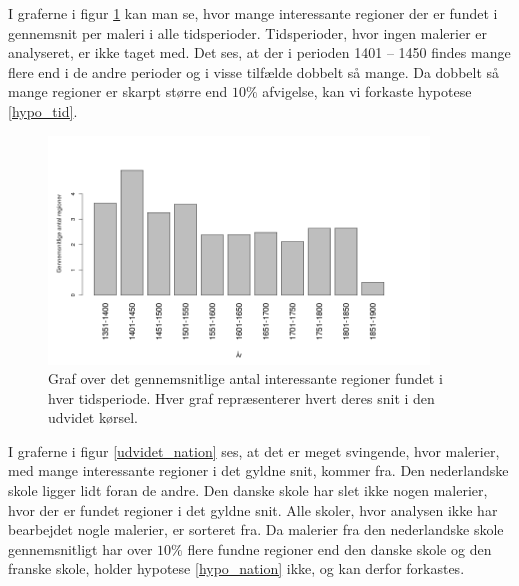{I graferne i figur \ref{udvidet_year} kan man se, hvor mange
interessante regioner der er fundet i gennemsnit per maleri i alle
tidsperioder.  Tidsperioder, hvor ingen malerier er analyseret, er ikke
taget med. Det ses, at der i perioden 1401 -- 1450 findes mange flere
end i de andre perioder og i visse tilfælde dobbelt så mange. Da
dobbelt så mange regioner er skarpt større end $10\%$ afvigelse, kan vi
forkaste hypotese \ref{hypo_tid}.

\begin{figure}[!h]
	\begin{center}
		\includegraphics[angle=0,width=0.90\textwidth]{afsnit/resultater/billeder/yearcutU.png}
	\end{center}
    \caption{Graf over det gennemsnitlige antal interessante regioner
    fundet i hver tidsperiode. Hver graf repræsenterer hvert deres snit
    i den udvidet kørsel.}
	\label{udvidet_year}
\end{figure}

I graferne i figur \ref{udvidet_nation} ses, at det er meget svingende,
hvor malerier, med mange interessante regioner i det gyldne snit, kommer
fra. Den nederlandske skole ligger lidt foran de andre. Den danske skole har slet ikke
nogen malerier, hvor der er fundet regioner i det gyldne snit. Alle
skoler, hvor analysen ikke har bearbejdet nogle malerier, er sorteret
fra. Da malerier fra den nederlandske skole gennemsnitligt har over
$10\%$ flere fundne regioner end den danske skole og den franske
skole, holder hypotese
\ref{hypo_nation} ikke, og kan derfor forkastes.

}

